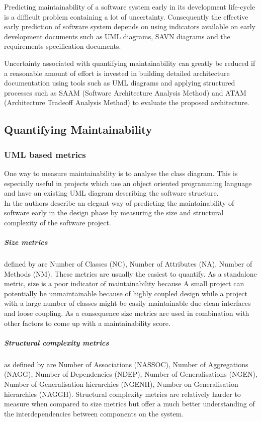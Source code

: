\documentclass[15pt]{article}
\begin{document}
Predicting maintainability of a software system early in its development life-cycle is a difficult problem containing a lot of uncertainty. Consequently the effective early prediction of software system depends on 	using indicators available on early development documents such as UML diagrams, SAVN diagrams and the requirements specification documents. 

Uncertainty associated with quantifying maintainability can greatly be reduced if a reasonable amount of effort is invested in building detailed architecture documentation using tools such as UML diagrams and applying structured processes such as SAAM (Software Architecture Analysis Method) and ATAM (Architecture Tradeoff Analysis Method) to evaluate the proposed architecture. 

\subsection{Quantifying Maintainability}
\subsubsection{UML based metrics}
One way to measure maintainability is to analyse the class diagram. This is especially useful in projects which use an object oriented programming language and have an existing UML diagram describing the software structure. \\

In \cite{genero_building_2007} the authors describe an elegant way of predicting the maintainability of software early in the design phase by measuring the size and structural complexity of the software project.

\subparagraph{Size metrics} defined by \cite{genero_building_2007} are Number of Classes (NC), Number of Attributes (NA), Number of Methods (NM). These metrics are usually the easiest to quantify. As a standalone metric, size is a poor indicator of maintainability because A small project can potentially be unmaintainable because of highly coupled design while a project with a large number of classes might be easily maintainable due clean interfaces and loose coupling. As a consequence size metrics are used in combination with other factors to come up with a maintainability score.

\subparagraph{Structural complexity metrics} as defined by \cite{genero_building_2007} are Number of Associations (NASSOC), Number of Aggregations (NAGG), Number of Dependencies (NDEP), Number of Generalisations (NGEN), Number of Generalisation hierarchies (NGENH), Number on Generalisation hierarchies (NAGGH). Structural complexity metrics are relatively harder to measure when compared to size metrics but offer a much better understanding of the interdependencies between components on the system.\\
\end{document}
